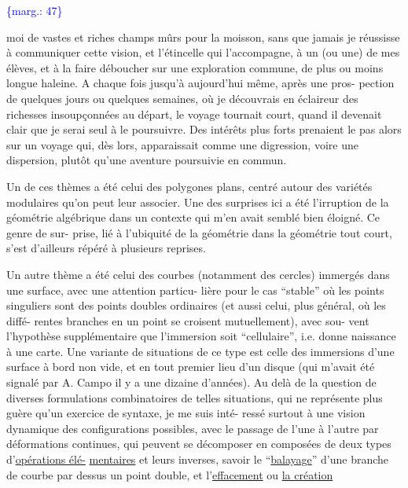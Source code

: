 \documentclass[11pt]{article}
\newcommand{\scanpage}[1]{\par\bigskip\noindent{\small\sffamily[scan #1]}\par}
\newcommand{\mspage}[1]{{\small\sffamily[p.\,#1]}}
\newcommand{\margin}[1]{\textcolor{blue}{\{\textsf{marg.:} #1\}}}
\newcommand{\uline}[1]{\underline{#1}}
\begin{document}
\margin{47}

\clearpage
\scanpage{119/48}
\mspage{46}

moi de vastes et riches champs mûrs pour la moisson, sans que
jamais je réussisse à communiquer cette vision, et l'étincelle
qui l'accompagne, à un (ou une) de mes élèves, et à la faire
déboucher sur une exploration commune, de plus ou moins longue
haleine. A chaque fois jusqu'à aujourd'hui même, après une pros-%
pection de quelques jours ou quelques semaines, où je découvrais
en éclaireur des richesses insoupçonnées au départ, le voyage
tournait court, quand il devenait clair que je serai seul à le
poursuivre. Des intérêts plus forts prenaient le pas alors sur
un voyage qui, dès lors, apparaissait comme une digression, voire
une dispersion, plutôt qu'une aventure poursuivie en commun.

Un de ces thèmes a été celui des polygones plans, centré
autour des variétés modulaires qu'on peut leur associer. Une des
surprises ici a été l'irruption de la géométrie algébrique dans
un contexte qui m'en avait semblé bien éloigné. Ce genre de sur-%
prise, lié à l'ubiquité de la géométrie dans la géométrie tout
court, s'est d'ailleurs répéré à plusieurs reprises.

Un autre thème a été celui des courbes (notamment des
cercles) immergés dans une surface, avec une attention particu-%
lière pour le cas ``stable'' où les points singuliers sont des points
doubles ordinaires (et aussi celui, plus général, où les diffé-%
rentes branches en un point se croisent mutuellement), avec sou-%
vent l'hypothèse supplémentaire que l'immersion soit ``cellulaire'',
i.e. donne naissance à une carte. Une variante de situations de
ce type est celle des immersions d'une surface à bord non vide,
et en tout premier lieu d'un disque (qui m'avait été signalé par
A. Campo il y a une dizaine d'années). Au delà de la question de
diverses formulations combinatoires de telles situations, qui ne
représente plus guère qu'un exercice de syntaxe, je me suis inté-%
ressé surtout à une vision dynamique des configurations possibles,
avec le passage de l'une à l'autre par déformations continues, qui
peuvent se décomposer en composées de deux types d'\uline{opérations élé-}%
\uline{mentaires} et leurs inverses, savoir le ``\uline{balayage}'' d'une branche
de courbe par dessus un point double, et l'\uline{effacement} ou \uline{la création}
\end{document}
